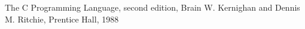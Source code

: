 
\begin{thebibliography}{1}
 The C Programming Language, second edition, Brain W. Kernighan and Dennis M. Ritchie, Prentice Hall, 1988
\end{thebibliography}
